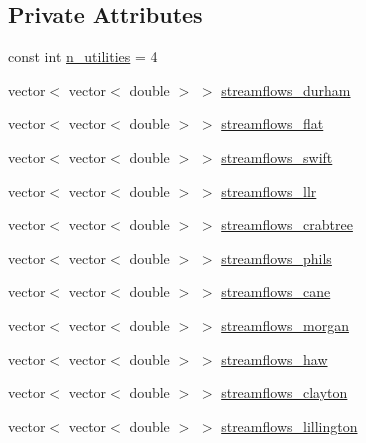\subsection*{Private Attributes}
\begin{DoxyCompactItemize}
\item 
const int \mbox{\hyperlink{classTriangle_a27fd697e6e14227b71a617ddbcec9653_a27fd697e6e14227b71a617ddbcec9653}{n\+\_\+utilities}} = 4
\item 
vector$<$ vector$<$ double $>$ $>$ \mbox{\hyperlink{classTriangle_a20fe79b08b5b0db16b3154d4d9a9b5eb_a20fe79b08b5b0db16b3154d4d9a9b5eb}{streamflows\+\_\+durham}}
\item 
vector$<$ vector$<$ double $>$ $>$ \mbox{\hyperlink{classTriangle_a1d93dad189b3fb422f5404f75a08b6f7_a1d93dad189b3fb422f5404f75a08b6f7}{streamflows\+\_\+flat}}
\item 
vector$<$ vector$<$ double $>$ $>$ \mbox{\hyperlink{classTriangle_a6fc8ddba9b9c2afea0ff19ac21343807_a6fc8ddba9b9c2afea0ff19ac21343807}{streamflows\+\_\+swift}}
\item 
vector$<$ vector$<$ double $>$ $>$ \mbox{\hyperlink{classTriangle_a776794a53c778e47ebe0f8a6b49cd740_a776794a53c778e47ebe0f8a6b49cd740}{streamflows\+\_\+llr}}
\item 
vector$<$ vector$<$ double $>$ $>$ \mbox{\hyperlink{classTriangle_a8c97075d74abc5e38084934fb213fe2a_a8c97075d74abc5e38084934fb213fe2a}{streamflows\+\_\+crabtree}}
\item 
vector$<$ vector$<$ double $>$ $>$ \mbox{\hyperlink{classTriangle_a936a703fc9bb94bce59bb0cbec005115_a936a703fc9bb94bce59bb0cbec005115}{streamflows\+\_\+phils}}
\item 
vector$<$ vector$<$ double $>$ $>$ \mbox{\hyperlink{classTriangle_a0a20ad805c77f2af96433b17eb3cc733_a0a20ad805c77f2af96433b17eb3cc733}{streamflows\+\_\+cane}}
\item 
vector$<$ vector$<$ double $>$ $>$ \mbox{\hyperlink{classTriangle_a3426e30cdc767333d491895438bdb00f_a3426e30cdc767333d491895438bdb00f}{streamflows\+\_\+morgan}}
\item 
vector$<$ vector$<$ double $>$ $>$ \mbox{\hyperlink{classTriangle_a2303d7ba019fa2c88ad9bcf4968b9522_a2303d7ba019fa2c88ad9bcf4968b9522}{streamflows\+\_\+haw}}
\item 
vector$<$ vector$<$ double $>$ $>$ \mbox{\hyperlink{classTriangle_a2c59e6b06ce2824ac697ca97c2423060_a2c59e6b06ce2824ac697ca97c2423060}{streamflows\+\_\+clayton}}
\item 
vector$<$ vector$<$ double $>$ $>$ \mbox{\hyperlink{classTriangle_ac69585cb9a4f8a477f030a3d66cea92f_ac69585cb9a4f8a477f030a3d66cea92f}{streamflows\+\_\+lillington}}

\end{DoxyCompactItemize}
